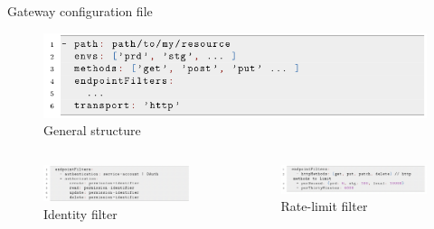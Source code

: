 \documentclass[10pt]{beamer}
\begin{document}
\begin{frame}{Gateway configuration file}
    \begin{figure}
        \centering
        \includegraphics[scale=0.5]{src/presentation/img/config-general.png}
        \caption{General structure}
        \label{fig:my_label}
    \end{figure}
    
    \begin{columns}
        \begin{figure}
            \centering
            \includegraphics[width=\textwidth]{src/presentation/img/config-identity.png}
            \caption{Identity filter}
        \end{figure}
        
        \begin{figure}
            \centering
            \includegraphics[width=\textwidth]{src/presentation/img/config-ratelimit.png}
            \caption{Rate-limit filter}
        \end{figure}
    \end{columns}
\end{frame}
\end{document}
